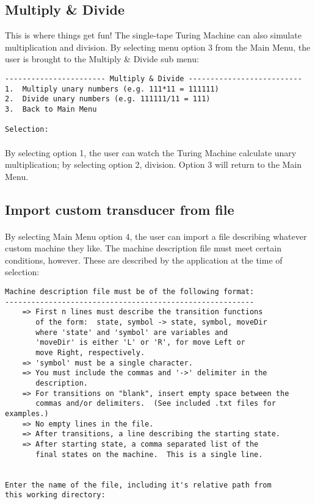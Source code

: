 \documentclass[12pt]{article}
\begin{document}
\subsection{Multiply \& Divide}
This is where things get fun!  The single-tape Turing Machine can also simulate 
multiplication and division.  By selecting menu option 3 from the Main Menu, 
the user is brought to the Multiply \& Divide sub menu:

\begin{verbatim}
----------------------- Multiply & Divide --------------------------
1.  Multiply unary numbers (e.g. 111*11 = 111111)
2.  Divide unary numbers (e.g. 111111/11 = 111)
3.  Back to Main Menu

Selection:  
\end{verbatim}

\paragraph{}
By selecting option 1, the user can watch the Turing Machine calculate unary 
multiplication; by selecting option 2, division.  Option 3 will return to the 
Main Menu.

\subsection{Import custom transducer from file}
\paragraph{}
By selecting Main Menu option 4, the user can import a file describing whatever 
custom machine they like.  The machine description file must meet certain 
conditions, however.  These are described by the application at the time of 
selection:

\begin{verbatim}
Machine description file must be of the following format:
---------------------------------------------------------
    => First n lines must describe the transition functions 
       of the form:  state, symbol -> state, symbol, moveDir
       where 'state' and 'symbol' are variables and 
       'moveDir' is either 'L' or 'R', for move Left or
       move Right, respectively.
    => 'symbol' must be a single character.
    => You must include the commas and '->' delimiter in the
       description.
    => For transitions on "blank", insert empty space between the
       commas and/or delimiters.  (See included .txt files for examples.)
    => No empty lines in the file.
    => After transitions, a line describing the starting state.
    => After starting state, a comma separated list of the 
       final states on the machine.  This is a single line.


Enter the name of the file, including it's relative path from 
this working directory:  
\end{verbatim}
\end{document}
